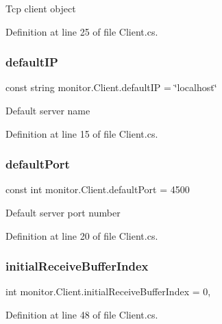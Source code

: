 Tcp client object 



Definition at line 25 of file Client.\+cs.

\mbox{\label{classmonitor_1_1_client_a326a20fe68a86757e16a6e45b8012640}} 
\subsubsection{default\+IP}
{\footnotesize\ttfamily const string monitor.\+Client.\+default\+IP = \char`\"{}localhost\char`\"{}}



Default server name 



Definition at line 15 of file Client.\+cs.

\mbox{\label{classmonitor_1_1_client_ad0a9bfc361ccef7443625f399e67f84a}} 
\subsubsection{default\+Port}
{\footnotesize\ttfamily const int monitor.\+Client.\+default\+Port = 4500}



Default server port number 



Definition at line 20 of file Client.\+cs.

\mbox{\label{classmonitor_1_1_client_afbbf4cf14d1a11747f6103e726dee77e}} 
\subsubsection{initial\+Receive\+Buffer\+Index}
{\footnotesize\ttfamily int monitor.\+Client.\+initial\+Receive\+Buffer\+Index = 0\hspace{0.3cm}{\ttfamily [static]}, {\ttfamily [private]}}



Definition at line 48 of file Client.\+cs.

